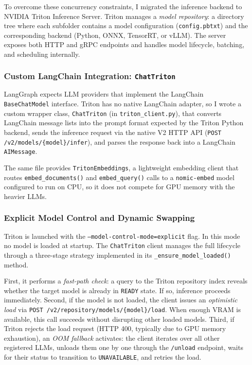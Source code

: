 To overcome these concurrency constraints, I migrated the inference backend to NVIDIA Triton Inference Server. Triton manages a \textit{model repository}: a directory tree where each subfolder contains a model configuration (\texttt{config.pbtxt}) and the corresponding backend (Python, ONNX, TensorRT, or vLLM). The server exposes both HTTP and gRPC endpoints and handles model lifecycle, batching, and scheduling internally.

\subsubsection{Custom LangChain Integration: \texttt{ChatTriton}}

LangGraph expects LLM providers that implement the LangChain \texttt{BaseChatModel} interface. Triton has no native LangChain adapter, so I wrote a custom wrapper class, \texttt{ChatTriton} (in \texttt{triton\_client.py}), that converts LangChain message lists into the prompt format expected by the Triton Python backend, sends the inference request via the native V2 HTTP API (\texttt{POST /v2/models/\{model\}/infer}), and parses the response back into a LangChain \texttt{AIMessage}.

The same file provides \texttt{TritonEmbeddings}, a lightweight embedding client that routes \texttt{embed\_documents()} and \texttt{embed\_query()} calls to a \texttt{nomic-embed} model configured to run on CPU, so it does not compete for GPU memory with the heavier LLMs.

\subsubsection{Explicit Model Control and Dynamic Swapping}

Triton is launched with the \texttt{--model-control-mode=explicit} flag. In this mode no model is loaded at startup. The \texttt{ChatTriton} client manages the full lifecycle through a three-stage strategy implemented in its \texttt{\_ensure\_model\_loaded()} method.

First, it performs a \textit{fast-path check}: a query to the Triton repository index reveals whether the target model is already in \texttt{READY} state. If so, inference proceeds immediately. Second, if the model is not loaded, the client issues an \textit{optimistic load} via \texttt{POST /v2/repository/models/\{model\}/load}. When enough VRAM is available, this call succeeds without disrupting other loaded models. Third, if Triton rejects the load request (HTTP 400, typically due to GPU memory exhaustion), an \textit{OOM fallback} activates: the client iterates over all other registered LLMs, unloads them one by one through the \texttt{/unload} endpoint, waits for their status to transition to \texttt{UNAVAILABLE}, and retries the load.

